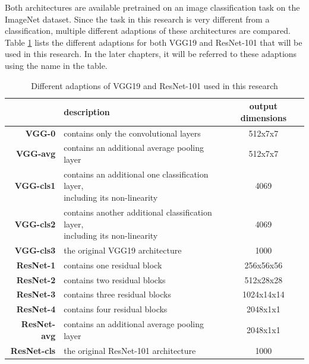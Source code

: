 Both architectures are available pretrained on an image classification task on the ImageNet dataset.
Since the task in this research is very different from a classification, multiple different adaptions of these architectures are compared. 
Table \ref{tab:feature-extractor-archs} lists the different adaptions for both VGG19 and ResNet-101 that will be used in this research.
In the later chapters, it will be referred to these adaptions using the name in the table.

\begin{table}[h]
    \centering
    \begin{tabular}{rlc}
        \toprule
                            & \textbf{description}                                            & \textbf{ output dimensions } \\\midrule
        \textbf{VGG-0}      & contains only the convolutional layers                          & 512x7x7                      \\
        \textbf{VGG-avg}    & contains an additional average pooling layer                    & 512x7x7                      \\
        \textbf{VGG-cls1}   & \makecell[cl]{contains an additional one classification layer,                                 \\ including its non-linearity} & 4069                         \\
        \textbf{VGG-cls2}   & \makecell[cl]{contains another additional classification layer,                                \\ including its non-linearity} & 4069                         \\
        \textbf{VGG-cls3}   & the original VGG19 architecture                                 & 1000                         \\\midrule
        \textbf{ResNet-1}   & contains one residual block                                     & 256x56x56                    \\
        \textbf{ResNet-2}   & contains two residual blocks                                    & 512x28x28                    \\
        \textbf{ResNet-3}   & contains three residual blocks                                  & 1024x14x14                   \\
        \textbf{ResNet-4}   & contains four residual blocks                                   & 2048x1x1                     \\
        \textbf{ResNet-avg} & contains an additional average pooling layer                    & 2048x1x1                     \\
        \textbf{ResNet-cls} & the original ResNet-101 architecture                            & 1000                         \\
        \bottomrule
    \end{tabular}
    \caption{Different adaptions of VGG19 and ResNet-101 used in this research}
    \label{tab:feature-extractor-archs}
\end{table}

